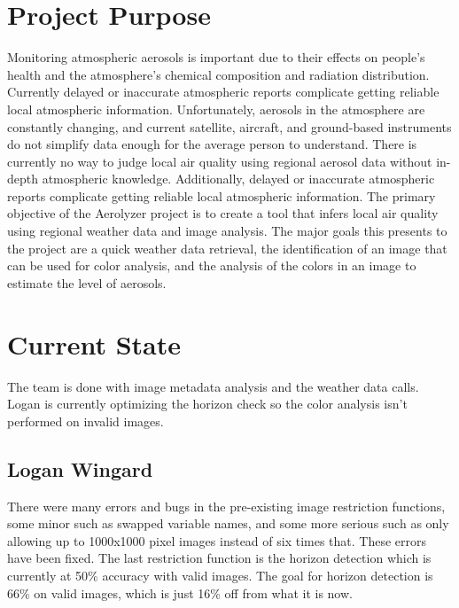 \documentclass[onecolumn, draftclsnofoot,10pt, compsoc]{IEEEtran}
\begin{document}
\tableofcontents
\clearpage

\begin{singlespace}

	\section{Project Purpose}
		Monitoring atmospheric aerosols is important due to their effects on people’s health and the atmosphere's chemical composition and radiation distribution.
		Currently delayed or inaccurate atmospheric reports complicate getting reliable local atmospheric information.
		Unfortunately, aerosols in the atmosphere are constantly changing, and current satellite, aircraft, and ground-based instruments do not simplify data enough for the average person to understand.
		There is currently no way to judge local air quality using regional aerosol data without in-depth atmospheric knowledge.
		Additionally, delayed or inaccurate atmospheric reports complicate getting reliable local atmospheric information.
		The primary objective of the Aerolyzer project is to create a tool that infers local air quality using regional weather data and image analysis.
		The major goals this presents to the project are a quick weather data retrieval, the identification of an image that can be used for color analysis, and the analysis of the colors in an image to estimate the level of aerosols.
	
	\section{Current State}
		The team is done with image metadata analysis and the weather data calls.
		Logan is currently optimizing the horizon check so the color analysis isn't performed on invalid images.
		\subsection{Logan Wingard}
			There were many errors and bugs in the pre-existing image restriction functions, some minor such as swapped variable names, and some more serious such as only allowing up to 1000x1000 pixel images instead of six times that.
			These errors have been fixed.
			The last restriction function is the horizon detection which is currently at 50\% accuracy with valid images.
			The goal for horizon detection is 66\% on valid images, which is just 16\% off from what it is now.

\end{singlespace}
\end{document}

